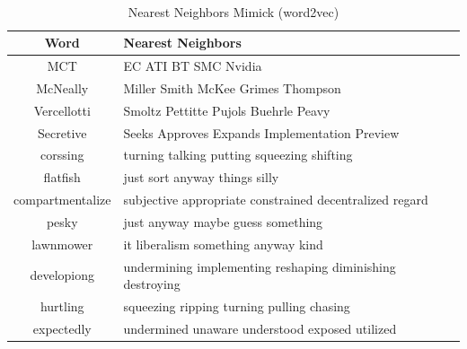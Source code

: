         \begin{table}[H]
          \begin{center}
            \caption{Nearest Neighbors Mimick (word2vec)}
            ~\\
            \label{tab:nearest:lstm-word2vec}
            \begin{tabular}{c|l}
              \textbf{Word} & \textbf{Nearest Neighbors}\\
              \hline
              MCT & EC ATI BT SMC Nvidia\\
              McNeally & Miller Smith McKee Grimes Thompson\\
              Vercellotti & Smoltz Pettitte Pujols Buehrle Peavy\\
              Secretive & Seeks Approves Expands Implementation Preview\\
              corssing & turning talking putting squeezing shifting\\
              flatfish & just sort anyway things silly\\
              compartmentalize & subjective appropriate constrained decentralized regard\\
              pesky & just anyway maybe guess something\\
              lawnmower & it liberalism something anyway kind\\
              developiong & undermining implementing reshaping diminishing destroying\\
              hurtling & squeezing ripping turning pulling chasing\\
              expectedly & undermined unaware understood exposed utilized\\
            \end{tabular}
          \end{center}
        \end{table}

